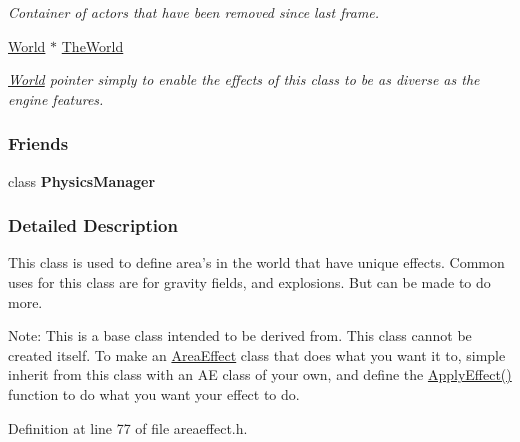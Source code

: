 \begin{DoxyCompactItemize}
\begin{DoxyCompactList}\small\item\em Container of actors that have been removed since last frame. \item\end{DoxyCompactList}\item 
\hypertarget{classMezzanine_1_1AreaEffect_acefbfa896daea1dfa41fb31fa65db01d}{
\hyperlink{classMezzanine_1_1World}{World} $\ast$ \hyperlink{classMezzanine_1_1AreaEffect_acefbfa896daea1dfa41fb31fa65db01d}{TheWorld}}
\label{classMezzanine_1_1AreaEffect_acefbfa896daea1dfa41fb31fa65db01d}

\begin{DoxyCompactList}\small\item\em \hyperlink{classMezzanine_1_1World}{World} pointer simply to enable the effects of this class to be as diverse as the engine features. \item\end{DoxyCompactList}\end{DoxyCompactItemize}
\subsubsection*{Friends}
\begin{DoxyCompactItemize}
\item 
\hypertarget{classMezzanine_1_1AreaEffect_a139cf05ac01161b7071c8a037c841683}{
class {\bfseries PhysicsManager}}
\label{classMezzanine_1_1AreaEffect_a139cf05ac01161b7071c8a037c841683}

\end{DoxyCompactItemize}


\subsubsection{Detailed Description}
This class is used to define area's in the world that have unique effects. Common uses for this class are for gravity fields, and explosions. But can be made to do more. \par
 Note: This is a base class intended to be derived from. This class cannot be created itself. To make an \hyperlink{classMezzanine_1_1AreaEffect}{AreaEffect} class that does what you want it to, simple inherit from this class with an AE class of your own, and define the \hyperlink{classMezzanine_1_1AreaEffect_a988cd958e49d65331a059951af3c2884}{ApplyEffect()} function to do what you want your effect to do. 

Definition at line 77 of file areaeffect.h.




